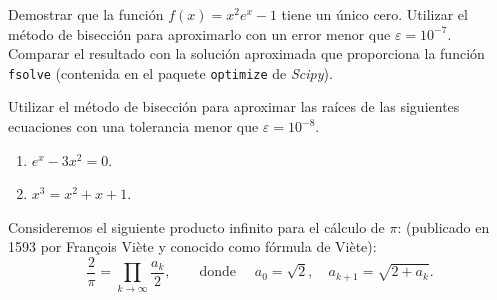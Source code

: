 \begin{problemas}
  \begin{problema}
    Demostrar que la función $f(x)=x^2e^{x}-1$ tiene un único
    cero. Utilizar el método de bisección para aproximarlo con un
    error menor que $\varepsilon=10^{-7}$. Comparar el resultado con
    la solución aproximada que proporciona la función \texttt{fsolve}
    (contenida en el paquete \texttt{optimize} de \textit{Scipy}).
  \end{problema}
  \begin{problema}
    Utilizar el método de bisección para aproximar las raíces de las
    siguientes ecuaciones con una tolerancia menor que
    $\varepsilon=10^{-8}$.
    \begin{enumerate}
    \item $e^x-3x^2=0$.
    \item $x^3=x^2+x+1$.
    \end{enumerate}
  \end{problema}
 \begin{problema}
    Consideremos el siguiente producto infinito para el cálculo de $\pi$:
    (publicado en 1593 por François Viète y conocido como fórmula de Viète):
    \begin{equation*}
      \frac{2}{\pi}  = \prod_{k\to\infty} \frac{a_k}2, \qquad\text{donde }\quad
      a_0 = \sqrt{2}, \quad a_{k+1} = \sqrt{2+a_k}.
    \end{equation*}


\end{problema}
\end{problemas}
